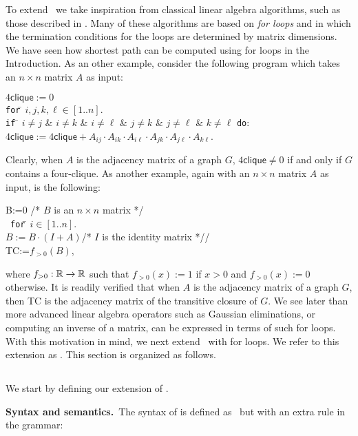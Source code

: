 To extend \lang\ we take inspiration from classical linear algebra algorithms, such as those described in \cite{num}. Many of these algorithms are based on \textit{for loops} and in which the termination conditions for the loops are determined by matrix dimensions. We have seen how shortest path can be computed using for loops in the Introduction. As an other example, consider the following program which takes
an $n\times n$ matrix $A$ as input:
\begin{tabbing}
$4\mathsf{clique}:=0$\\
\texttt{for}\=\,  $i,j,k,\ell\in[1..n]$. \\
\> \texttt{if} \= $i\neq j$ \& $i\neq k$ \& $i\neq \ell$ \& $j\neq k$ \& $j\neq \ell$ \& $k\neq\ell$ \texttt{do}:\\
\> \> $4\mathsf{clique}:= 4\mathsf{clique} + A_{ij}\cdot A_{ik}\cdot A_{i\ell} \cdot A_{jk}\cdot A_{j\ell} \cdot A_{k\ell}$.  
\end{tabbing}
Clearly, when $A$ is the adjacency matrix of a graph $G$, $4\mathsf{clique}\neq 0$ if and only if $G$ contains a four-clique. As another example, again with an $n\times n$ matrix $A$ as input, is the following:
\begin{tabbing}
B:=0 \quad /* $B$ is an $n\times n$ matrix */\\\	
\texttt{for}\=\,  $i\in[1..n]$.\\
\> $B:=B\cdot (I+A)$\quad /* $I$ is the identity matrix *//\\
\textsf{TC}:=$f_{>0}(B)$,
\end{tabbing}
where $f_{>0}:\mathbb{R}\to\mathbb{R}$ such that $f_{>0}(x):=1$ if $x>0$ and $f_{>0}(x):=0$ otherwise. It is readily verified that when $A$ is the adjacency matrix of a graph $G$, then \textsf{TC} is the adjacency matrix of the transitive closure of $G$.
We see later than more advanced linear algebra operators such as Gaussian eliminations, or computing an inverse of a matrix, can be expressed in terms of such for loops. With this motivation in mind, we next extend \lang\ with for loops. We refer to this extension as \langfor. This section is organized as follows.


\subsection{\langfor}
We start by defining our extension of \lang.

%
%
%
\smallskip
\noindent
\textbf{Syntax and semantics.}\, The syntax of \langfor is defined as \lang\, but with an extra rule in the grammar:
\medskip

